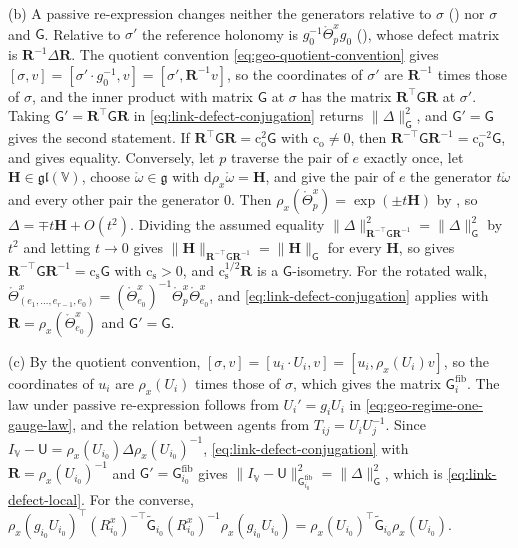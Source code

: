 (b) A passive re-expression changes neither the generators relative to $\sigma$
() nor $\sigma$ and $\mathsf G$. Relative to $\sigma'$ the reference
holonomy is $g_0^{-1}\mathring\Theta^x_pg_0$ (), whose defect matrix is
$\mathbf R^{-1}\Delta\mathbf R$. The quotient convention \cref{eq:geo-quotient-convention} gives
$[\sigma,v]=[\sigma'\cdot g_0^{-1},v]=[\sigma',\mathbf R^{-1}v]$, so the coordinates of $\sigma'$ are
$\mathbf R^{-1}$ times those of $\sigma$, and the inner product with matrix $\mathsf G$ at $\sigma$ has
the matrix $\mathbf R^\top\mathsf G\mathbf R$ at $\sigma'$. Taking $\mathsf G'=\mathbf R^\top\mathsf G\mathbf R$
in \cref{eq:link-defect-conjugation} returns $\lVert\Delta\rVert^2_{\mathsf G}$, and $\mathsf G'=\mathsf G$
gives the second statement. If $\mathbf R^\top\mathsf G\mathbf R=\mathrm c_{\mathrm o}^2\mathsf G$ with
$\mathrm c_{\mathrm o}\neq0$, then
$\mathbf R^{-\top}\mathsf G\mathbf R^{-1}=\mathrm c_{\mathrm o}^{-2}\mathsf G$, and
 gives equality. Conversely, let $p$ traverse the pair of $e$
exactly once, let $\mathbf H\in\mathfrak{gl}(\mathbb V)$, choose $\mathring\omega\in\mathfrak g$ with
$\mathrm d\rho_x\mathring\omega=\mathbf H$, and give the pair of $e$ the generator $t\mathring\omega$ and
every other pair the generator $0$. Then $\rho_x(\mathring\Theta^x_p)=\exp(\pm t\mathbf H)$ by
, so $\Delta=\mp t\mathbf H+O(t^2)$. Dividing the assumed equality
$\lVert\Delta\rVert^2_{\mathbf R^{-\top}\mathsf G\mathbf R^{-1}}=\lVert\Delta\rVert^2_{\mathsf G}$ by $t^2$ and
letting $t\to0$ gives
$\lVert\mathbf H\rVert_{\mathbf R^{-\top}\mathsf G\mathbf R^{-1}}=\lVert\mathbf H\rVert_{\mathsf G}$ for every
$\mathbf H$, so  gives
$\mathbf R^{-\top}\mathsf G\mathbf R^{-1}=\mathrm c_{\mathrm s}\mathsf G$ with $\mathrm c_{\mathrm s}>0$, and
$\mathrm c_{\mathrm s}^{1/2}\mathbf R$ is a $\mathsf G$-isometry. For the rotated walk,
$\mathring\Theta^x_{(e_1,\ldots,e_{r-1},e_0)}=(\mathring\Theta^x_{e_0})^{-1}\mathring\Theta^x_p\mathring\Theta^x_{e_0}$,
and \cref{eq:link-defect-conjugation} applies with $\mathbf R=\rho_x(\mathring\Theta^x_{e_0})$ and
$\mathsf G'=\mathsf G$.

(c) By the quotient convention, $[\sigma,v]=[u_i\cdot U_i,v]=[u_i,\rho_x(U_i)v]$, so the coordinates of
$u_i$ are $\rho_x(U_i)$ times those of $\sigma$, which gives the matrix $\mathsf G^{\mathrm{fib}}_i$. The
law under passive re-expression follows from $U_i'=g_iU_i$ in \cref{eq:geo-regime-one-gauge-law}, and
the relation between agents from $T_{ij}=U_iU_j^{-1}$. Since
$I_{\mathbb V}-\mathsf U=\rho_x(U_{i_0})\Delta\rho_x(U_{i_0})^{-1}$, \cref{eq:link-defect-conjugation} with
$\mathbf R=\rho_x(U_{i_0})^{-1}$ and $\mathsf G'=\mathsf G^{\mathrm{fib}}_{i_0}$ gives
$\lVert I_{\mathbb V}-\mathsf U\rVert^2_{\mathsf G^{\mathrm{fib}}_{i_0}}=\lVert\Delta\rVert^2_{\mathsf G}$,
which is \cref{eq:link-defect-local}. For the converse,
$\rho_x(g_{i_0}U_{i_0})^\top(R^x_{i_0})^{-\top}\widetilde{\mathsf G}_{i_0}(R^x_{i_0})^{-1}\rho_x(g_{i_0}U_{i_0})
=\rho_x(U_{i_0})^\top\widetilde{\mathsf G}_{i_0}\rho_x(U_{i_0})$.

